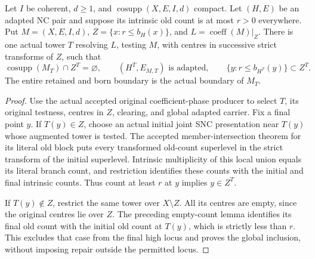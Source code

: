 \begin{lemma}
\label{hir:original-old-branch-lowdep-high-cut}
\leanok
Let $I$ be coherent, $d\ge1$, and $\operatorname{cosupp}(X,E,I,d)$
compact. Let $(H,E)$ be an adapted NC pair and suppose its intrinsic
old count is at most $r>0$ everywhere. Put
$M=(X,E,I,d)$, $Z=\{x:r\le b_H(x)\}$, and
$L=\operatorname{coeff}(M)|_Z$.
There is one actual tower $T$ resolving $L$, testing $M$, with centres
in successive strict transforms of $Z$, such that
\[
 \operatorname{cosupp}(M_T)\cap Z^T=\varnothing,
 \qquad (H^T,E_{M,T})\text{ is adapted},\qquad
 \{y:r\le b_{H^T}(y)\}\subset Z^T.
\]
The entire retained and born boundary is the actual boundary of $M_T$.
\end{lemma}
\begin{proof}
Use the actual accepted original coefficient-phase producer to select
$T$, its original testness, centres in $Z$, clearing, and global adapted
carrier. Fix a final point $y$. If $T(y)\in Z$, choose an actual initial
joint SNC presentation near $T(y)$ whose augmented tower is tested.
The accepted member-intersection theorem for its literal old block
puts every transformed old-count superlevel in the strict transform
of the initial superlevel. Intrinsic multiplicity of this local union
equals its literal branch count, and restriction identifies these
counts with the initial and final intrinsic counts. Thus count at
least $r$ at $y$ implies $y\in Z^T$.

If $T(y)\notin Z$, restrict the same tower over $X\setminus Z$.
All its centres are empty, since the original centres lie over $Z$.
The preceding empty-count lemma identifies its final old count with
the initial old count at $T(y)$, which is strictly less than $r$.
This excludes that case from the final high locus and proves the
global inclusion, without imposing repair outside the permitted locus.
\end{proof}

